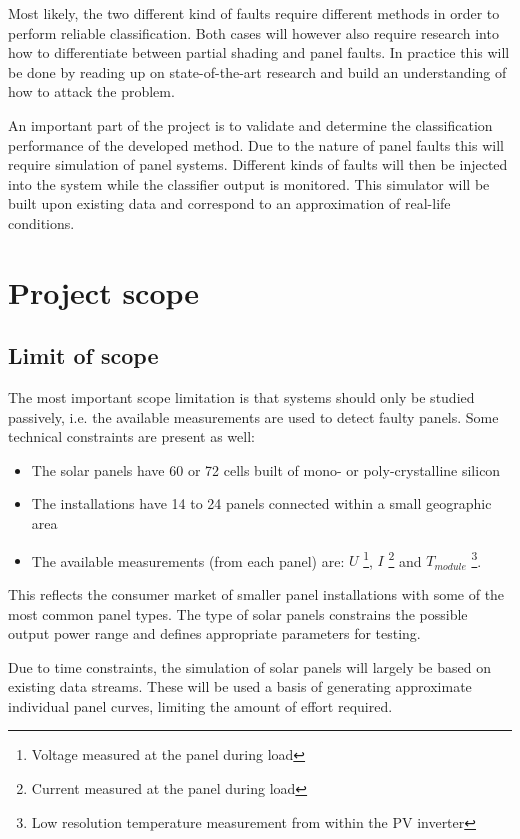 \documentclass[a4paper,11pt]{article}
\begin{document}
Most likely, the two different kind of faults require different methods in order to perform reliable classification.
Both cases will however also require research into how to differentiate between partial shading and panel faults.
In practice this will be done by reading up on state-of-the-art research and build an understanding of how to attack the problem.

An important part of the project is to validate and determine the classification performance of the developed method.
Due to the nature of panel faults this will require simulation of panel systems.
Different kinds of faults will then be injected into the system while the classifier output is monitored.
This simulator will be built upon existing data and correspond to an approximation of real-life conditions.

\section*{Project scope}
\subsection*{Limit of scope}
The most important scope limitation is that systems should only be studied passively, i.e. the available measurements are used to detect faulty panels.  
Some technical constraints are present as well:
\begin{itemize}
\item The solar panels have 60 or 72 cells built of mono- or poly-crystalline silicon

\item The installations have 14 to 24 panels connected within a small geographic area

\item The available measurements (from each panel) are:
$U$ \footnote{Voltage measured at the panel during load},
$I$ \footnote{Current measured at the panel during load} and
$T_{module}$ \footnote{Low resolution temperature measurement from within the PV inverter}.

\end{itemize}

This reflects the consumer market of smaller panel installations with some of the most common panel types.
The type of solar panels constrains the possible output power range and defines appropriate parameters for testing.

Due to time constraints, the simulation of solar panels will largely be based on existing data streams.
These will be used a basis of generating approximate individual panel curves, limiting the amount of effort required.
\end{document}
